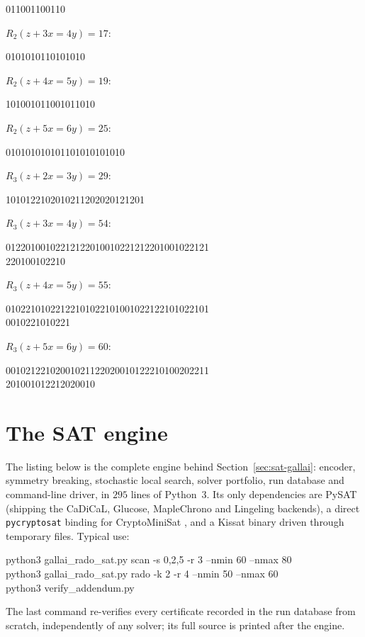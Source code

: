 \documentclass[12pt]{article}
\begin{document}
\begin{center}\ttfamily\footnotesize
011001100110
\end{center}
$R_{2}(z+3x=4y)=17$:

\begin{center}\ttfamily\footnotesize
0101010110101010
\end{center}
$R_{2}(z+4x=5y)=19$:

\begin{center}\ttfamily\footnotesize
101001011001011010
\end{center}
$R_{2}(z+5x=6y)=25$:

\begin{center}\ttfamily\footnotesize
010101010101101010101010
\end{center}
$R_{3}(z+2x=3y)=29$:

\begin{center}\ttfamily\footnotesize
1010122102010211202020121201
\end{center}
$R_{3}(z+3x=4y)=54$:

\begin{center}\ttfamily\footnotesize
01220100102212122010010221212201001022121\\
220100102210
\end{center}
$R_{3}(z+4x=5y)=55$:

\begin{center}\ttfamily\footnotesize
01022101022122101022101001022122101022101\\
0010221010221
\end{center}
$R_{3}(z+5x=6y)=60$:

\begin{center}\ttfamily\footnotesize
00102122102001021122020010122210100202211\\
201001012212020010
\end{center}

\section{The SAT engine}\label{app:engine}

The listing below is the complete engine behind
Section~\ref{sec:sat-gallai}: encoder, symmetry breaking, stochastic
local search, solver portfolio, run database and command-line driver,
in $295$ lines of Python~3. Its only dependencies are PySAT
\cite{pysat2018} (shipping the CaDiCaL, Glucose, MapleChrono and
Lingeling backends), a direct \texttt{pycryptosat} binding for
CryptoMiniSat \cite{cryptominisat2009}, and a Kissat binary
\cite{kissat2022} driven through temporary files. Typical use:
\begin{center}\ttfamily\footnotesize
python3 gallai\_rado\_sat.py scan -s 0,2,5 -r 3 --nmin 60 --nmax 80\\
python3 gallai\_rado\_sat.py rado -k 2 -r 4 --nmin 50 --nmax 60\\
python3 verify\_addendum.py
\end{center}
The last command re-verifies every certificate recorded in the run
database from scratch, independently of any solver; its full source
is printed after the engine.
\end{document}
